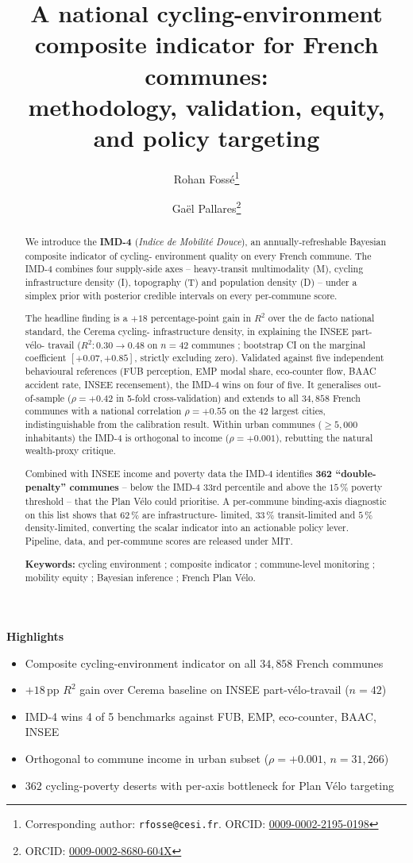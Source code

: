 \documentclass[11pt,a4paper]{article}
\title{\Large\bfseries A national cycling-environment composite indicator
for French communes:\\
\large methodology, validation, equity, and policy targeting}
\author[1]{Rohan Foss\'e\thanks{Corresponding author: \texttt{rfosse@cesi.fr}. ORCID: \href{https://orcid.org/0009-0002-2195-0198}{0009-0002-2195-0198}}}
\author[2]{Ga\"el Pallares\thanks{ORCID: \href{https://orcid.org/0009-0002-8680-604X}{0009-0002-8680-604X}}}
\affil[1]{CESI Engineering School, Montpellier, France}
\affil[2]{CESI LINEACT (EA 7527), Montpellier, France}
\date{}
\newenvironment{highlights}{%
  \par\noindent\textbf{\large Highlights}\par\smallskip
  \begin{itemize}[leftmargin=1.4em,itemsep=0.15em,topsep=0.2em]}{%
  \end{itemize}\par\medskip}
\begin{document}
\maketitle

\begin{abstract}
\noindent
We introduce the \textbf{IMD-4} (\emph{Indice de Mobilit\'e Douce}),
an annually-refreshable Bayesian composite indicator of cycling-
environment quality on every French commune.  The IMD-4 combines
four supply-side axes -- heavy-transit multimodality (M), cycling
infrastructure density (I), topography (T) and population density
(D) -- under a simplex prior with posterior credible intervals on
every per-commune score.

The headline finding is a $+18$ percentage-point gain in $R^2$
over the de facto national standard, the Cerema cycling-
infrastructure density, in explaining the INSEE part-v\'elo-
travail ($R^2: 0.30 \to 0.48$ on $n=42$ communes ; bootstrap CI
on the marginal coefficient $[+0.07, +0.85]$, strictly excluding
zero).  Validated against five independent behavioural references
(FUB perception, EMP modal share, eco-counter flow, BAAC accident
rate, INSEE recensement), the IMD-4 wins on four of five.  It
generalises out-of-sample ($\rho = +0.42$ in 5-fold
cross-validation) and extends to all $34{,}858$ French communes
with a national correlation $\rho = +0.55$ on the 42 largest
cities, indistinguishable from the calibration result.  Within
urban communes ($\geq 5{,}000$ inhabitants) the IMD-4 is
orthogonal to income ($\rho = +0.001$), rebutting the natural
wealth-proxy critique.

Combined with INSEE income and poverty data the IMD-4 identifies
\textbf{362 ``double-penalty'' communes} -- below the IMD-4 33rd
percentile and above the $15\,\%$ poverty threshold -- that the
Plan V\'elo could prioritise.  A per-commune binding-axis
diagnostic on this list shows that $62\,\%$ are infrastructure-
limited, $33\,\%$ transit-limited and $5\,\%$ density-limited,
converting the scalar indicator into an actionable policy lever.
Pipeline, data, and per-commune scores are released under MIT.

\noindent\textbf{Keywords:}
cycling environment ; composite indicator ; commune-level monitoring ;
mobility equity ; Bayesian inference ; French Plan V\'elo.
\end{abstract}

\begin{highlights}
\item Composite cycling-environment indicator on all $34{,}858$ French communes
\item $+18$\,pp $R^2$ gain over Cerema baseline on INSEE part-v\'elo-travail ($n=42$)
\item IMD-4 wins 4 of 5 benchmarks against FUB, EMP, eco-counter, BAAC, INSEE
\item Orthogonal to commune income in urban subset ($\rho=+0.001$, $n=31{,}266$)
\item $362$ cycling-poverty deserts with per-axis bottleneck for Plan V\'elo targeting
\end{highlights}
\end{document}
